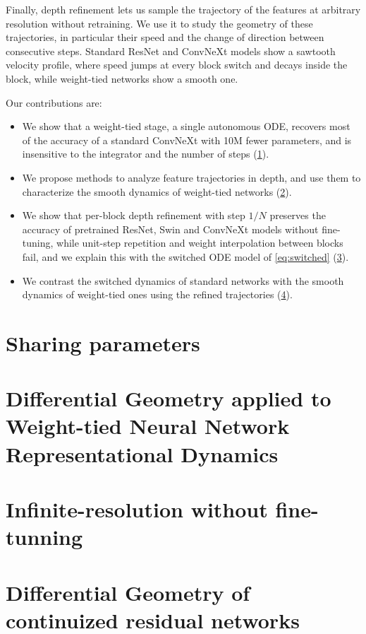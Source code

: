 \documentclass{article}
\theoremstyle{plain}
\theoremstyle{definition}
\theoremstyle{remark}
\begin{document}
Finally, depth refinement lets us sample the trajectory of the features at arbitrary resolution without retraining.
We use it to study the geometry of these trajectories, in particular their speed and the change of direction
between consecutive steps.
Standard ResNet and ConvNeXt models show a sawtooth velocity profile, where speed jumps at every block switch
and decays inside the block, while weight-tied networks show a smooth one.

Our contributions are:
\begin{itemize}
    \item We show that a weight-tied stage, a single autonomous ODE, recovers most of the accuracy
    of a standard ConvNeXt with 10M fewer parameters, and is insensitive to the integrator and the number of steps
    (\cref{sec:sharing}).
    \item We propose methods to analyze feature trajectories in depth, and use them to characterize the smooth
    dynamics of weight-tied networks (\cref{sec:geometry-tied}).
    \item We show that per-block depth refinement with step $1/N$ preserves the accuracy of pretrained ResNet,
    Swin and ConvNeXt models without fine-tuning, while unit-step repetition and weight interpolation between blocks fail,
    and we explain this with the switched ODE model of \cref{eq:switched} (\cref{sec:refinement}).
    \item We contrast the switched dynamics of standard networks with the smooth dynamics of weight-tied ones
    using the refined trajectories (\cref{sec:geometry-continuized}).
\end{itemize}

\section{Sharing parameters}
\label{sec:sharing}

\section{Differential Geometry applied to Weight-tied Neural Network Representational Dynamics}
\label{sec:geometry-tied}

\section{Infinite-resolution without fine-tunning}
\label{sec:refinement}

\section{Differential Geometry of continuized residual networks}
\label{sec:geometry-continuized}



\end{document}
